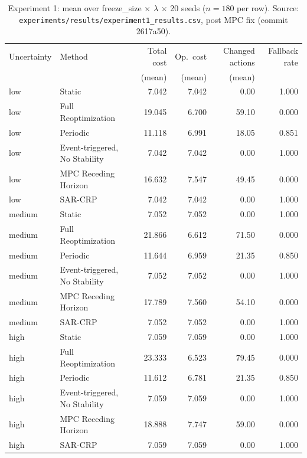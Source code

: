 \documentclass[11pt]{article}
\begin{document}
\begin{table}[h]
\centering
\small
\begin{tabular}{llrrrr}
\hline
Uncertainty & Method & Total cost & Op.\ cost & Changed actions & Fallback rate \\
            &        & (mean)     & (mean)    & (mean)           &               \\
\hline
low    & Static                        & 7.042  & 7.042 & 0.00  & 1.000 \\
low    & Full Reoptimization           & 19.045 & 6.700 & 59.10 & 0.000 \\
low    & Periodic                      & 11.118 & 6.991 & 18.05 & 0.851 \\
low    & Event-triggered, No Stability & 7.042  & 7.042 & 0.00  & 1.000 \\
low    & MPC Receding Horizon          & 16.632 & 7.547 & 49.45 & 0.000 \\
low    & SAR-CRP                       & 7.042  & 7.042 & 0.00  & 1.000 \\
\hline
medium & Static                        & 7.052  & 7.052 & 0.00  & 1.000 \\
medium & Full Reoptimization           & 21.866 & 6.612 & 71.50 & 0.000 \\
medium & Periodic                      & 11.644 & 6.959 & 21.35 & 0.850 \\
medium & Event-triggered, No Stability & 7.052  & 7.052 & 0.00  & 1.000 \\
medium & MPC Receding Horizon          & 17.789 & 7.560 & 54.10 & 0.000 \\
medium & SAR-CRP                       & 7.052  & 7.052 & 0.00  & 1.000 \\
\hline
high   & Static                        & 7.059  & 7.059 & 0.00  & 1.000 \\
high   & Full Reoptimization           & 23.333 & 6.523 & 79.45 & 0.000 \\
high   & Periodic                      & 11.612 & 6.781 & 21.35 & 0.850 \\
high   & Event-triggered, No Stability & 7.059  & 7.059 & 0.00  & 1.000 \\
high   & MPC Receding Horizon          & 18.888 & 7.747 & 59.00 & 0.000 \\
high   & SAR-CRP                       & 7.059  & 7.059 & 0.00  & 1.000 \\
\hline
\end{tabular}
\caption{Experiment 1: mean over freeze\_size $\times$ $\lambda$ $\times$ 20 seeds ($n=180$ per row). Source: \texttt{experiments/results/experiment1\_results.csv}, post MPC fix (commit 2617a50).}
\end{table}
\end{document}
